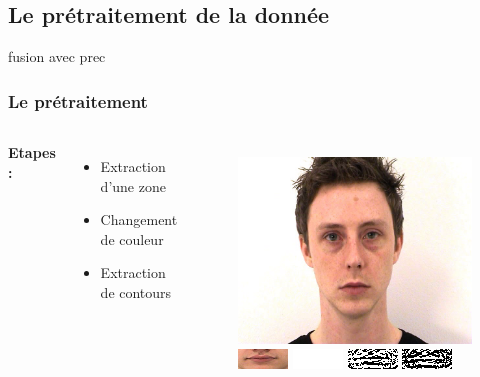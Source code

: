 \documentclass{beamer}
\begin{document}
\subsection{Le prétraitement de la donnée}
fusion avec prec
\begin{frame}
  \frametitle{Le prétraitement}
  \begin{columns}[c] 
      \textbf{Etapes :}
      \begin{itemize}
        \item Extraction d'une zone
        \item Changement de couleur
        \item Extraction de contours
      \end{itemize}

      \begin{figure}[position]
      	\centering
        \includegraphics[scale=0.15]{image/img_001.png}
        \vfill
        \vspace{2mm}
        \includegraphics{image/cropped.png}
        \vfill
        \vspace{2mm}
        \includegraphics{image/grayscale.png}
        \vfill
        \vspace{2mm}
        \includegraphics{image/dog_on.png}
        \hspace{3mm}
        \includegraphics{image/dog_off.png}
      \end{figure}
  \end{columns}
\end{frame}
\end{document}
